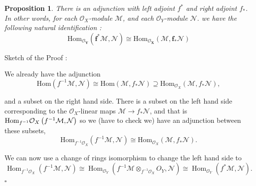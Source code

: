 \documentclass{article}
\newtheorem{proposition}[theorem]{Proposition}
\newenvironment{Proof}{{\noindent \indent \it Proof:\quad}}{\hfill $\square$\par}
\begin{document}
\begin{proposition}
    There is an adjunction with left adjoint $f^{\ast}$ and right adjoint $f_{\ast}$. In other words, for each ${\mathcal{O}}_{X}$-module $\mathcal{M}$, and each ${\mathcal{O}}_{Y}$-module ${\mathcal{N}}.$ we have the following natural identification :
$$
\bm{\mathrm{Hom}_{\mathcal O_Y}(f^\ast\mathcal M,\mathcal N) \cong \mathrm{Hom}_{\mathcal O_X}(\mathcal M,f_\ast\mathcal N)} 
$$
\end{proposition}
\begin{Proof}
    Sketch of the Proof :
    
    We already have the adjunction
$$
\mathrm{Hom}(f^{-1}\mathcal{M},\mathcal{N})\cong\mathrm{Hom}(\mathcal{M},f_{*}\mathcal{N})\supseteq\mathrm{Hom}_{\mathcal{O}_{X}}(\mathcal{M},f_{*}\mathcal{N}), 
$$

and a subset on the right hand side. There is a subset on the left hand side corresponding to the ${\mathcal{O}}_{X}$-linear maps ${\mathcal{M}}\to f_{\ast}\mathcal N$, and that is $\mathrm{Hom}_{f^{-1}}{\cal O}_{X}\left(f^{-1}{\cal M},{\cal N}\right)$  so we (have to check we) have an adjunction between these subsets,
$$
\mathrm{Hom}_{f^{-1}\mathcal{O}_{X}}(f^{-1}\mathcal{M},\mathcal{N})\cong\mathrm{Hom}_{\mathcal{O}_{X}}(\mathcal{M},f_{*}\mathcal{N}). 
$$

We can now use a change of rings isomorphism to change the left hand side to
$$
\operatorname{Hom}_{f^{-1}\mathcal O_X}\left(f^{-1}{\mathcal{M}},{\mathcal{N}}\right)\cong\operatorname{Hom}_{\mathcal{O}_{Y}}\left(f^{-1}{\mathcal{M}}\otimes_{f^{-1}\mathcal O_X}O_{Y},{\mathcal{N}}\right)\cong\operatorname{Hom}_{\mathcal{O}_{Y}}\left(f^{*}{\mathcal{M}},{\mathcal{N}}\right). 
$$ 
\end{Proof}
\end{document}
